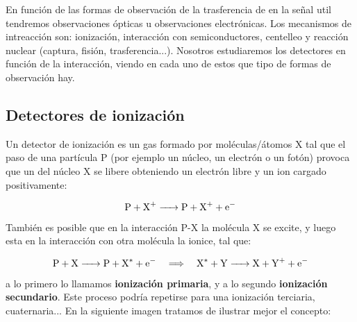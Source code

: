 En función de las formas de observación de la trasferencia de en la señal util tendremos observaciones ópticas u observaciones electrónicas. Los mecanismos de intreacción son: ionización, interacción con semiconductores, centelleo y reacción nuclear (captura, fisión, trasferencia...). Nosotros estudiaremos los detectores en función de la interacción, viendo en cada uno de estos que tipo de formas de observación hay. 

\subsection{Detectores de ionización}

Un detector de ionización es un gas formado por moléculas/átomos X tal que el paso de una partícula P (por ejemplo un núcleo, un electrón o un fotón) provoca que un del núcleo X se libere obteniendo un electrón libre y un ion cargado positivamente:

\[ \ce{P + X+ -> P +  X+ + e-} \]
También es posible que en la interacción P-X la molécula X se excite, y luego esta en la interacción con otra molécula la ionice, tal que: 

\[ \ce{P + X -> P +  X^* + e-} \quad \Longrightarrow \quad  \ce{X^* + Y -> X + Y^+ + e-}  \]
a lo primero lo llamamos \textbf{ionización primaria}, y a lo segundo \textbf{ionización secundario}. Este proceso podría repetirse para una ionización terciaria, cuaternaria... En la siguiente imagen tratamos de ilustrar mejor el concepto: 

